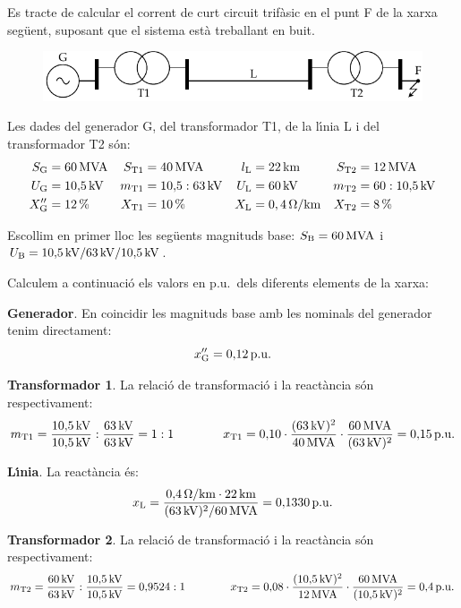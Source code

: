 \begin{exemple}

Es tracte de calcular el corrent de curt circuit trif\`{a}sic en el punt F de la xarxa seg\"{u}ent, suposant
que el sistema est\`{a} treballant en buit.
\begin{figure}[htb]
\vspace{3mm} \centering
    \includegraphics{Imatges/Cap-CalcBas-pu-Circuit1.pdf}
\end{figure}

Les dades del generador G, del transformador T1, de la l\'{\i}nia L i del transformador T2 s\'{o}n:
\begin{align*}
   S_\mathrm{G} &= 60\mathrm{\,MVA} & S_\mathrm{T1} &= 40\mathrm{\,MVA} & l_\mathrm{L} &= 22\mathrm{\,km} & S_\mathrm{T2} &= 12\mathrm{\,MVA} \\
   U_\mathrm{G} &= 10{,}5\mathrm{\,kV} & m_\mathrm{T1} &= 10{,}5:63\mathrm{\,kV} & U_\mathrm{L} &= 60\mathrm{\,kV} & m_\mathrm{T2} &= 60:10{,}5\mathrm{\,kV} \\
   X''_\mathrm{G} &= 12\mathrm{\,\%} & X_\mathrm{T1} &= 10\mathrm{\,\%} & X_\mathrm{L} &= 0,4\mathrm{\,\mathrm{\Omega}/km} & X_\mathrm{T2} &= 8\mathrm{\,\%}
\end{align*}

Escollim en primer lloc les seg\"{u}ents magnituds base: $S_\mathrm{B} = 60\mathrm{\,MVA}$ i $U_\mathrm{B}
= 10{,}5\mathrm{\,kV} / 63\mathrm{\,kV} / 10{,}5\mathrm{\,kV}$.

Calculem a continuaci\'{o} els valors en p.u.\ dels diferents elements de la xarxa:

\textbf{Generador}. En coincidir les magnituds base amb les nominals del generador tenim
 directament:
\[
x''_\mathrm{G} = 0{,}12\mathrm{\,p.u.}
\]

\textbf{Transformador 1}. La relaci\'{o} de transformaci\'{o} i la react\`{a}ncia s\'{o}n respectivament:
\[
m_\mathrm{T1} = \frac{10{,}5\mathrm{\,kV}}{10{,}5\mathrm{\,kV}} :
\frac{63\mathrm{\,kV}}{63\mathrm{\,kV}} = 1:1 \qquad\qquad x_\mathrm{T1} =
0{,}10 \cdot \frac{(63\mathrm{\,kV})^2}{40\mathrm{\,MVA}} \cdot
\frac{60\mathrm{\,MVA}}{(63\mathrm{\,kV})^2}  = 0{,}15\mathrm{\,p.u.}
\]

\textbf{L\'{\i}nia}. La react\`{a}ncia \'{e}s:
\[x_\mathrm{L} = \frac{0{,}4\mathrm{\,\mathrm{\Omega}/km} \cdot 22\mathrm{\,km}} {(63\mathrm{\,kV})^2/60\mathrm{\,MVA}}  = 0{,}1330\mathrm{\,p.u.}
\]

\textbf{Transformador 2}. La relaci\'{o} de transformaci\'{o} i la react\`{a}ncia s\'{o}n respectivament:
\[
m_\mathrm{T2} = \frac{60\mathrm{\,kV}}{63\mathrm{\,kV}} :
\frac{10{,}5\mathrm{\,kV}}{10{,}5\mathrm{\,kV}} = 0{,}9524:1 \qquad\qquad
x_\mathrm{T2} = 0{,}08 \cdot \frac{(10{,}5\mathrm{\,kV})^2}{12\mathrm{\,MVA}}
\cdot \frac{60\mathrm{\,MVA}}{(10{,}5\mathrm{\,kV})^2}  = 0{,}4\mathrm{\,p.u.}
\]


\end{exemple}
